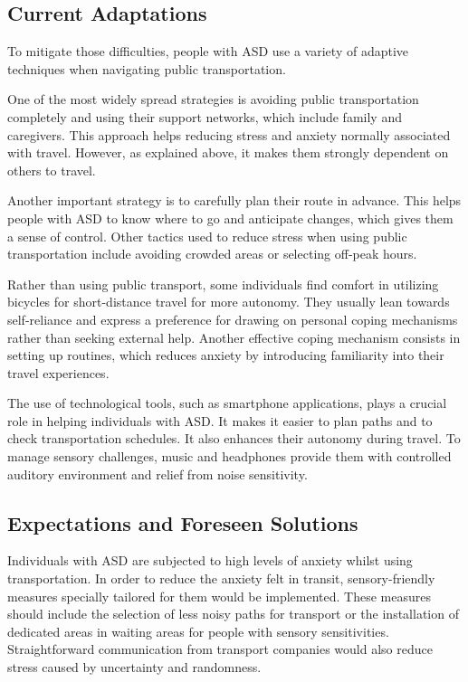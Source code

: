 \subsection{Current Adaptations}

To mitigate those difficulties, people with ASD use a variety of adaptive techniques when navigating public transportation. 

One of the most widely spread strategies is avoiding public transportation completely and using their support networks, which include family and caregivers\cite{2015DetourRightPlace}. This approach helps reducing stress and anxiety normally associated with travel. However, as explained above, it makes them strongly dependent on others to travel. 

Another important strategy is to carefully plan their route in advance\cite{2020ExperiencesYoungAutistic}. This helps people with ASD to know where to go and anticipate changes, which gives them a sense of control. Other tactics used to reduce stress when using public transportation include avoiding crowded areas or selecting off-peak hours.

Rather than using public transport, some individuals find comfort in utilizing bicycles for short-distance travel\cite{2015ViewpointsAdultsAutism} for more autonomy. They usually lean towards self-reliance and express a preference for drawing on personal coping mechanisms rather than seeking external help. Another effective coping mechanism consists in setting up routines\cite{2015ViewpointsAdultsAutism}, which reduces anxiety by introducing familiarity into their travel experiences. 

The use of technological tools, such as smartphone applications, plays a crucial role in helping individuals with ASD. It makes it easier to plan paths and to check transportation schedules. It also enhances their autonomy during travel. To manage sensory challenges, music and headphones provide them with controlled auditory environment and relief from noise sensitivity\cite{2020ExperiencesYoungAutistic}. 

\subsection{Expectations and Foreseen Solutions}

Individuals with ASD are subjected to high levels of anxiety whilst using transportation. In order to reduce the anxiety felt in transit, sensory-friendly measures specially tailored for them would be implemented\cite{2020ExperiencesYoungAutistic}. These measures should include the selection of less noisy paths for transport or the installation of dedicated areas in waiting areas for people with sensory sensitivities. Straightforward communication from transport companies would also reduce stress caused by uncertainty and randomness.

